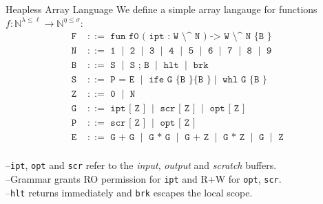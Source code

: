 \documentclass{beamer}
\begin{document}
\begin{frame}{Heapless Array Language}
  \vspace{-0.2cm}
  We define a simple array langauge for functions $f: \mathbb{N}^{\lambda\leq \ell} \rightarrow \mathbb{N}^{\eta\leq\sigma}$:
  {
  \[
    \begin{aligned}
      \texttt{F } &::= \texttt{ fun f0 ( ipt : W \char`\^\ N ) -> W \char`\^\ N \{ B \} } \\
      \texttt{N } &::= \texttt{ 1 } \mid \texttt{ 2 }  \mid \texttt{ 3 } \mid \texttt{ 4 } \mid \texttt{ 5 } \mid \texttt{ 6 } \mid \texttt{ 7 } \mid \texttt{ 8 } \mid \texttt{ 9 } \\
      \texttt{B } &::= \texttt{ S } \mid \texttt{ S ; B } \mid \texttt{ hlt } \mid \texttt{ brk} \\
      \texttt{S } &::= \texttt{ P = E } \mid \texttt{ ife G \{ B \} \{ B \} } \mid \texttt{ whl G \{ B \}}\\
      \texttt{Z } &::= \texttt{ 0 } \mid \texttt{ N}\\
      \texttt{G } &::= \texttt{ ipt [ Z ] } \mid \texttt{ scr [ Z ] } \mid \texttt{ opt [ Z ]} \\
      \texttt{P } &::= \texttt{ scr [ Z ] } \mid \texttt{ opt [ Z ]} \\
      \texttt{E } &::= \texttt{ G + G } \mid \texttt{ G * G } \mid \texttt{ G + Z } \mid \texttt{ G * Z } \mid \texttt{ G } \mid \texttt{ Z }\\
    \end{aligned}
  \]
  }

  --\:\:\texttt{ipt}, \texttt{opt} and \texttt{scr} refer to the \textit{input}, \textit{output} and \textit{scratch} buffers.\\--\:\:Grammar grants RO permission for \texttt{ipt} and R+W for \texttt{opt}, \texttt{scr}.\\--\:\:\texttt{hlt} returns immediately and \texttt{brk} escapes the local scope.
\end{frame}
\end{document}
